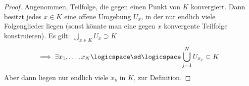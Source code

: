 \begin{proof}
    Angenommen, \tnexists Teilfolge, die gegen einen Punkt von \( K \) konvergiert. Dann besitzt jedes \( x\in K \) eine offene Umgebung \( U_x \), in der nur endlich viele Folgenglieder liegen (sonst könnte man eine gegen \( x \) konvergente Teilfolge konstruieren). Es gilt: \( \bigcup_{x\in K}U_x\supset K \)
    \begin{align*}
        \implies \exists x_1,\ldots, x_N\logicspace \sd \logicspace \bigcup_{j=1}^{N}U_{x_j}\subset K   
    \end{align*}
    Aber dann liegen nur endlich viele \( x_k \) in \( K \), \contra zur Definition.
    
\end{proof}



